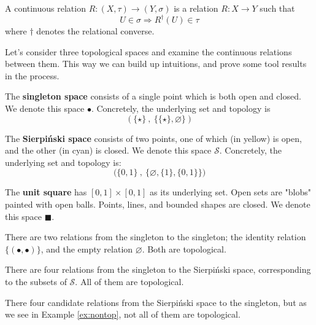 
\clearmargin

\begin{defn}\label{defn:Contrelation}
A continuous relation $R: (X,\tau) \rightarrow (Y,\sigma)$ is a relation $R: X \rightarrow Y$ such that \[U \in \sigma \Rightarrow R^{\dag}(U) \in \tau\] where $\dag$ denotes the relational converse.
\end{defn}

Let's consider three topological spaces and examine the continuous relations between them. This way we can build up intuitions, and prove some tool results in the process.

The \textbf{singleton space} consists of a single point which is both open and closed. We denote this space $\bullet$. Concretely, the underlying set and topology is
\[(\{\star\} \ , \ \{\{\star\},\varnothing\})\] 

The \textbf{Sierpi\'{n}ski space} consists of two points, one of which (in yellow) is open, and the other (in cyan) is closed. We denote this space $\mathcal{S}$. Concretely, the underlying set and topology is:
\[\big( \{0,1\} \ , \ \{ \varnothing, \{ 1 \} , \{ 0,1\} \} \big)\]

The \textbf{unit square} has $[0,1] \times [0,1]$ as its underlying set.  Open sets are "blobs" painted with open balls. Points, lines, and bounded shapes are closed. We denote this space $\blacksquare$.

\newthought{$\bullet \rightarrow \bullet$:} There are two relations from the singleton to the singleton; the identity relation $\{ (\bullet,\bullet) \}$, and the empty relation $\varnothing$. Both are topological.

 There are four relations from the singleton to the Sierpi\'{n}ski space, corresponding to the subsets of $\mathcal{S}$. All of them are topological.


There four candidate relations from the Sierpi\'{n}ski space to the singleton, but as we see in Example \ref{ex:nontop}, not all of them are topological.

